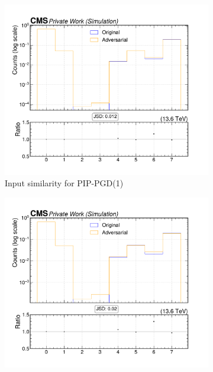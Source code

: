 \begin{figure}[htbp]
  \centering
  \begin{subfigure}[t]{0.32\textwidth}
    \includegraphics[width=\linewidth]{media/output/features/compare/combined_it_1/cmp_cpf_arr_Cpfcan_VTX_ass.pdf}
    \caption*{Input similarity for PIP-PGD(1)}
  \end{subfigure}\hfill
  \begin{subfigure}[t]{0.32\textwidth}
    \includegraphics[width=\linewidth]{media/output/features/compare/combined_it_2/cmp_cpf_arr_Cpfcan_VTX_ass.pdf}

\end{subfigure}
\end{figure}
